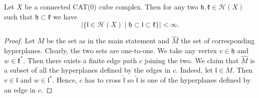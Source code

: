 \begin{lemma}
  \label{lem:finite-interval}
  Let \(X\) be a connected CAT(0) cube complex. Then for any two \(\mathfrak{h,k} \in \mathcal{H}(X)\) such that \(\mathfrak{h} \subset \mathfrak{k}\) we have
  \[
    |\{\mathfrak{l} \in \mathcal{H}(X) \mid \mathfrak{h} \subset \mathfrak{l} \subset \mathfrak{k}\}| < \infty.
  \]
\end{lemma}

\begin{proof}
  Let \(M\) be the set as in the main statement and \(\hat M\) the set of corresponding hyperplanes. Clearly, the two sets are one-to-one. We take any vertex \(v \in \mathfrak{h}\)  and \(w \in \mathfrak{k}^\ast\). Then there exists a finite edge path \(c\) joining the two. We claim that \(\hat M\) is a subset of all the hyperplanes defined by the edges in \(c\). Indeed, let \(\mathfrak{l} \in M\). Then \(v \in \mathfrak{l}\) and \(w \in \mathfrak{l}^\ast\). Hence, \(c\) has to cross \(\mathfrak{\hat l}\) so \(\mathfrak{\hat l}\) is one of the hyperplanes defined by an edge in \(c\).
\end{proof}

